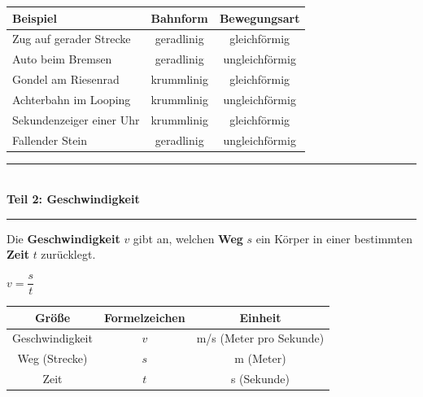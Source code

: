 \documentclass[11pt, a4paper]{article}
\newcommand{\seitentitel}[1]{%
    \noindent\textcolor{physik}{\rule{\textwidth}{2pt}}\\[0.3em]
    {\LARGE\bfseries\textcolor{physik}{#1}}\\[0.2em]
    \textcolor{physik}{\rule{\textwidth}{0.5pt}}
    \vspace{0.5em}
}
\newcommand{\abschnitt}[1]{%
    \vspace{6pt}%
    \noindent{\large\bfseries\textcolor{physik}{#1}}%
    \vspace{4pt}%
}
\begin{document}
\vspace{0.5em}

\abschnitt{Beispiele aus dem Alltag}

\begin{center}
\renewcommand{\arraystretch}{1.3}
\begin{tabular}{|p{4.2cm}|c|c|}
\hline
\textbf{Beispiel} & \textbf{Bahnform} & \textbf{Bewegungsart} \\
\hline
Zug auf gerader Strecke & geradlinig & gleichförmig \\
\hline
Auto beim Bremsen & geradlinig & ungleichförmig \\
\hline
Gondel am Riesenrad & krummlinig & gleichförmig \\
\hline
Achterbahn im Looping & krummlinig & ungleichförmig \\
\hline
Sekundenzeiger einer Uhr & krummlinig & gleichförmig \\
\hline
Fallender Stein & geradlinig & ungleichförmig \\
\hline
\end{tabular}
\end{center}


\newpage

\seitentitel{Teil 2: Geschwindigkeit}

\begin{merkkasten}
Die \textbf{Geschwindigkeit} $v$ gibt an, welchen \textbf{Weg} $s$ ein Körper in einer bestimmten \textbf{Zeit} $t$ zurücklegt.
\end{merkkasten}

\vspace{0.3em}

\begin{formelbox}
\begin{center}
{\Large $v = \dfrac{s}{t}$}

\vspace{0.8em}

\renewcommand{\arraystretch}{1.4}
\begin{tabular}{|c|c|c|}
\hline
\textbf{Größe} & \textbf{Formelzeichen} & \textbf{Einheit} \\
\hline
Geschwindigkeit & $v$ & m/s (Meter pro Sekunde) \\
\hline
Weg (Strecke) & $s$ & m (Meter) \\
\hline
Zeit & $t$ & s (Sekunde) \\
\hline
\end{tabular}
\end{center}
\end{formelbox}
\end{document}
